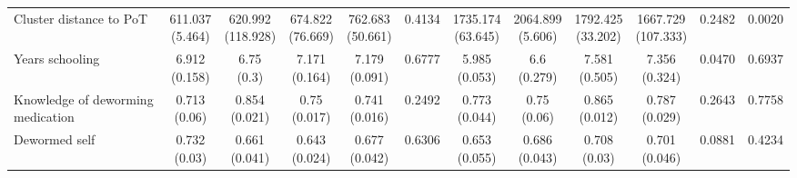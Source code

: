 {\begin{tabular}[t]{lccccccccccc}
\hspace{1em}Cluster distance to PoT & \makecell[c]{611.037\\(5.464)} & \makecell[c]{620.992\\(118.928)} & \makecell[c]{674.822\\(76.669)} & \makecell[c]{762.683\\(50.661)} & 0.4134 & \makecell[c]{1735.174\\(63.645)} & \makecell[c]{2064.899\\(5.606)} & \makecell[c]{1792.425\\(33.202)} & \makecell[c]{1667.729\\(107.333)} & 0.2482 & 0.0020\\
\hspace{1em}Years schooling & \makecell[c]{6.912\\(0.158)} & \makecell[c]{6.75\\(0.3)} & \makecell[c]{7.171\\(0.164)} & \makecell[c]{7.179\\(0.091)} & 0.6777 & \makecell[c]{5.985\\(0.053)} & \makecell[c]{6.6\\(0.279)} & \makecell[c]{7.581\\(0.505)} & \makecell[c]{7.356\\(0.324)} & 0.0470 & 0.6937\\
\hspace{1em}Knowledge of deworming medication & \makecell[c]{0.713\\(0.06)} & \makecell[c]{0.854\\(0.021)} & \makecell[c]{0.75\\(0.017)} & \makecell[c]{0.741\\(0.016)} & 0.2492 & \makecell[c]{0.773\\(0.044)} & \makecell[c]{0.75\\(0.06)} & \makecell[c]{0.865\\(0.012)} & \makecell[c]{0.787\\(0.029)} & 0.2643 & 0.7758\\
\hspace{1em}Dewormed self & \makecell[c]{0.732\\(0.03)} & \makecell[c]{0.661\\(0.041)} & \makecell[c]{0.643\\(0.024)} & \makecell[c]{0.677\\(0.042)} & 0.6306 & \makecell[c]{0.653\\(0.055)} & \makecell[c]{0.686\\(0.043)} & \makecell[c]{0.708\\(0.03)} & \makecell[c]{0.701\\(0.046)} & 0.0881 & 0.4234\\

\end{tabular}}
